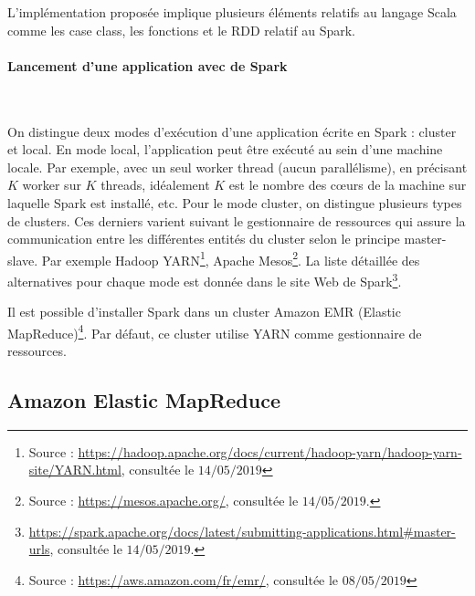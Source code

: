 L'implémentation proposée implique plusieurs éléments relatifs au langage Scala comme les case class, les fonctions et le RDD relatif au Spark. 

\paragraph{Lancement d'une application avec de Spark} \label{spark-master-modes}~

On distingue deux modes d'exécution d'une application écrite en Spark : cluster et local. En  mode local, l'application  peut être exécuté au sein d'une machine locale. Par exemple,  avec un seul worker thread (aucun parallélisme),  en précisant $K$ worker sur $K$ threads, idéalement $K$ est le nombre des  c\oe{}urs de la machine sur laquelle Spark est installé, etc. 
 Pour le mode cluster, on distingue plusieurs types de clusters. Ces derniers  varient suivant le gestionnaire de ressources qui assure la communication entre les différentes entités du cluster selon le principe master-slave. Par exemple Hadoop YARN\footnote{Source : \url{https://hadoop.apache.org/docs/current/hadoop-yarn/hadoop-yarn-site/YARN.html}, consultée  le $14/05/2019$ }, Apache Mesos\footnote{Source : \url{https://mesos.apache.org/}, consultée le $14/05/2019$.}. La liste détaillée des alternatives pour chaque mode est donnée dans le site Web de Spark\footnote{\url{https://spark.apache.org/docs/latest/submitting-applications.html\#master-urls}, consultée le $14/05/2019$.}. 
 
Il est possible d'installer Spark dans un cluster Amazon EMR (Elastic MapReduce)\footnote{Source : \url{https://aws.amazon.com/fr/emr/}, consultée le $08/05/2019$}. Par défaut, ce cluster utilise YARN comme gestionnaire de ressources.


\subsection{Amazon Elastic MapReduce}

